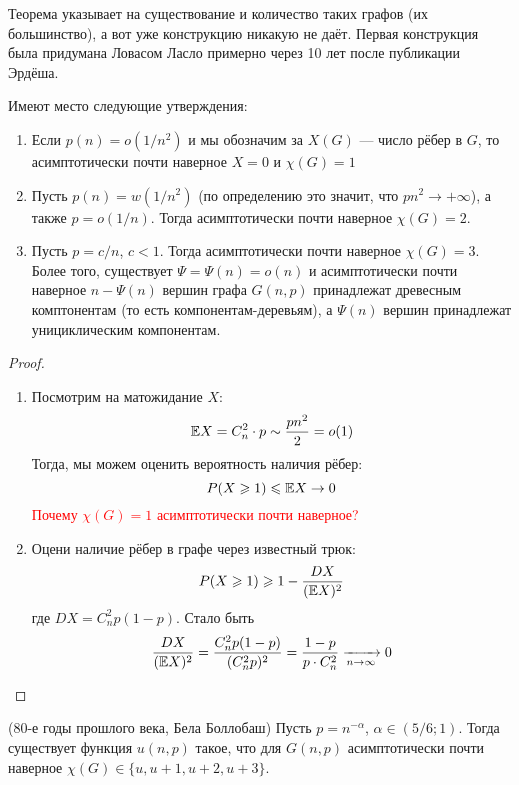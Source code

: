 \begin{note}
	Теорема указывает на существование и количество таких графов (их большинство), а вот уже конструкцию никакую не даёт. Первая конструкция была придумана Ловасом Ласло примерно через 10 лет после публикации Эрдёша.
\end{note}

\begin{proposition}
	Имеют место следующие утверждения:
	\begin{enumerate}
		\item Если $p(n) = o(1 / n^2)$ и мы обозначим за $X(G)$ --- число рёбер в $G$, то асимптотически почти наверное $X = 0$ и $\chi(G) = 1$
		
		\item Пусть $p(n) = w(1 / n^2)$ (по определению это значит, что $pn^2 \to +\infty$), а также $p = o(1 / n)$. Тогда асимптотически почти наверное $\chi(G) = 2$.
		
		\item Пусть $p = c / n$, $c < 1$. Тогда асимптотически почти наверное $\chi(G) = 3$. Более того, существует $\Psi = \Psi(n) = o(n)$ и асимптотически почти наверное $n - \Psi(n)$ вершин графа $G(n, p)$ принадлежат древесным комптонентам (то есть компонентам-деревьям), а $\Psi(n)$ вершин принадлежат унициклическим компонентам.
	\end{enumerate}
\end{proposition}

\begin{proof}~
	\begin{enumerate}
		\item Посмотрим на матожидание $X$:
		\[
			\mathbb{E} X = C_n^2 \cdot p \sim \frac{pn^2}{2} = o(1)
		\]
		Тогда, мы можем оценить вероятность наличия рёбер:
		\[
			P(X \geqslant 1) \leqslant \mathbb{E} X \to 0
		\]
		\textcolor{red}{Почему $\chi(G) = 1$ асимптотически почти наверное?}
		
		\item Оцени наличие рёбер в графе через известный трюк:
		\[
			P(X \geqslant 1) \geqslant 1 - \frac{DX}{(\mathbb{E} X)^2}
		\]
		где $DX = C_n^2 p(1 - p)$. Стало быть
		\[
			\frac{DX}{(\mathbb{E} X)^2} = \frac{C_n^2 p(1 - p)}{(C_n^2 p)^2} = \frac{1 - p}{p \cdot C_n^2} \xrightarrow[n \to \infty]{} 0
		\]
	\end{enumerate}
\end{proof}

\begin{theorem} (80-е годы прошлого века, Бела Боллобаш)
	Пусть $p = n^{-\alpha}$, $\alpha \in (5 / 6; 1)$. Тогда существует функция $u(n, p)$ такое, что для $G(n, p)$ асимптотически почти наверное $\chi(G) \in \{u, u + 1, u + 2, u + 3\}$.
\end{theorem}

